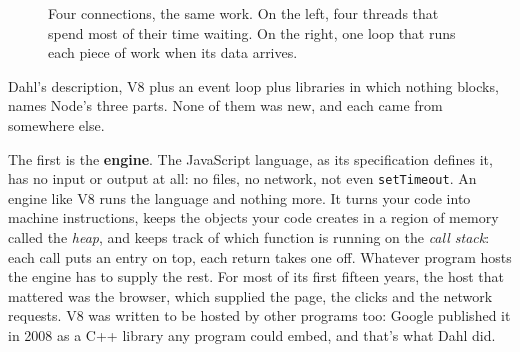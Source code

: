 \begin{figure}[htbp]
\centering
{}
\caption{Four connections, the same work. On the left, four threads that spend
most of their time waiting. On the right, one loop that runs each piece of work
when its data arrives.}
\end{figure}

Dahl's description, V8 plus an event loop plus libraries in which nothing
blocks, names Node's three parts. None of them was new, and each came from
somewhere else.

The first is the \textbf{engine}. The JavaScript language, as its specification
defines it, has no input or output at all: no files, no network, not even
\texttt{setTimeout}. An engine like V8 runs the language and nothing more. It
turns your code into machine instructions, keeps the objects your code creates
in a region of memory called the \emph{heap}, and keeps track of which function
is running on the \emph{call stack}: each call puts an entry on top, each return
takes one off. Whatever program hosts the engine has to supply the rest. For
most of its first fifteen years, the host that mattered was the browser, which
supplied the page, the clicks and the network requests. V8 was written to be
hosted by other programs too: Google published it in 2008 as a C++ library any
program could embed, and that's what Dahl did.

